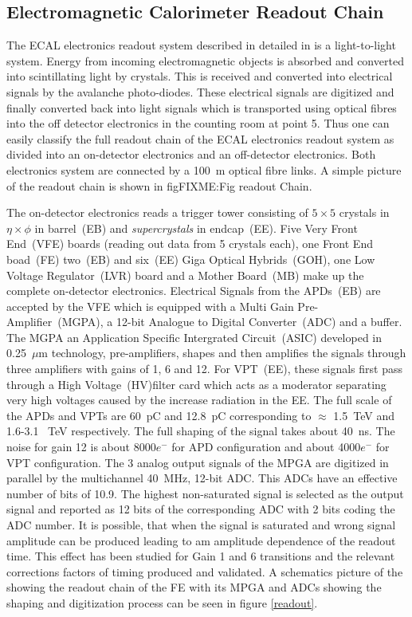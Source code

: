\subsection{Electromagnetic Calorimeter Readout Chain}
The ECAL electronics readout system described in detailed in \cite{ECALREADOUT} is a light-to-light system. Energy from incoming electromagnetic objects is absorbed and converted into scintillating light by \pb crystals. This is received and converted into electrical signals by the avalanche photo-diodes. These electrical signals are digitized and finally converted back into light signals which is transported using optical fibres into the off detector electronics in the counting room at point 5. Thus one can easily classify the full readout chain of the ECAL electronics readout system as divided into an on-detector electronics and an off-detector electronics.
Both electronics system are connected by a 100~m optical fibre links. A simple picture of the readout chain is shown in fig{FIXME:Fig readout Chain}.

The on-detector electronics reads a trigger tower consisting of $5\times5$ crystals in $\eta \times \phi$ in barrel~(EB) and \textit{supercrystals} in endcap~(EE). Five Very Front End~(VFE) boards (reading out data from 5 crystals each), one Front End boad~(FE) two~(EB) and six~(EE) Giga Optical Hybrids~(GOH), one Low Voltage Regulator~(LVR) board and a Mother Board~(MB) make up the complete on-detector electronics. Electrical Signals from the APDs~(EB) are accepted by the VFE which is equipped with a Multi Gain Pre-Amplifier~(MGPA), a 12-bit Analogue to Digital Converter~(ADC) and a buffer. The MGPA an Application Specific Intergrated Circuit~(ASIC) developed in 0.25~$\mu$m technology, pre-amplifiers, shapes and then amplifies the signals through three amplifiers with gains of 1, 6 and 12. For VPT~(EE), these signals first pass through a High Voltage~(HV)filter card which acts as a moderator separating very high voltages caused by the increase radiation in the EE. The full scale of the APDs and VPTs are 60~pC and 12.8~pC corresponding to $\approx$ 1.5~TeV and 1.6-3.1~ TeV respectively. The full shaping of the signal takes about 40~ns. The noise for gain 12 is about 8000$e^{-}$ for APD configuration and about 4000$e^{-}$ for VPT configuration. 
The 3 analog output signals of the MPGA are digitized in parallel by the multichannel 40~MHz, 12-bit ADC. This ADCs have an effective number of bits of 10.9. The highest non-saturated signal is selected as the output signal and reported as 12 bits of the corresponding ADC with 2 bits coding the ADC number. It is possible, that when the signal is saturated and wrong signal amplitude can be produced leading to am amplitude dependence of the readout time. This effect has been studied for Gain 1 and 6 transitions and the relevant corrections factors of timing produced and validated.
A schematics picture of the showing the readout chain of the FE with its MPGA and ADCs showing the shaping and digitization process can be seen in figure \eqref{readout}.

